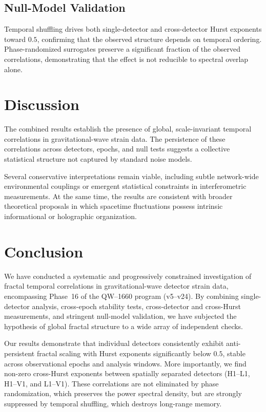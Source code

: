 \documentclass[11pt,a4paper]{article}
\begin{document}
\subsection{Null-Model Validation}
Temporal shuffling drives both single-detector and cross-detector Hurst exponents toward $0.5$, confirming that the observed structure depends on temporal ordering. Phase-randomized surrogates preserve a significant fraction of the observed correlations, demonstrating that the effect is not reducible to spectral overlap alone.

\section{Discussion}
The combined results establish the presence of global, scale-invariant temporal correlations in gravitational-wave strain data. The persistence of these correlations across detectors, epochs, and null tests suggests a collective statistical structure not captured by standard noise models.

Several conservative interpretations remain viable, including subtle network-wide environmental couplings or emergent statistical constraints in interferometric measurements. At the same time, the results are consistent with broader theoretical proposals in which spacetime fluctuations possess intrinsic informational or holographic organization.

\section{Conclusion}
We have conducted a systematic and progressively constrained investigation of fractal temporal correlations in gravitational-wave detector strain data, encompassing Phase~16 of the QW--1660 program (v5--v24). By combining single-detector analysis, cross-epoch stability tests, cross-detector and cross-Hurst measurements, and stringent null-model validation, we have subjected the hypothesis of global fractal structure to a wide array of independent checks.

Our results demonstrate that individual detectors consistently exhibit anti-persistent fractal scaling with Hurst exponents significantly below $0.5$, stable across observational epochs and analysis windows. More importantly, we find non-zero cross-Hurst exponents between spatially separated detectors (H1--L1, H1--V1, and L1--V1). These correlations are not eliminated by phase randomization, which preserves the power spectral density, but are strongly suppressed by temporal shuffling, which destroys long-range memory.
\end{document}
